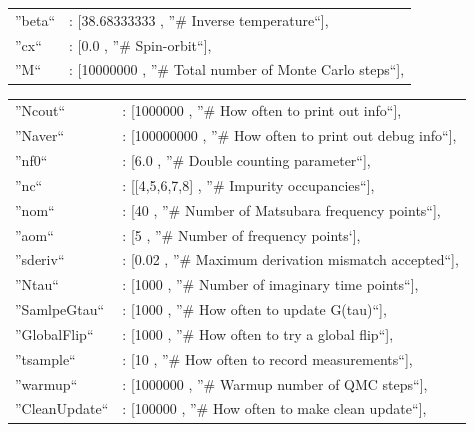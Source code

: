 \documentclass[12 pt]{article}
\begin{document}
\begin{itemize}
{\begin{tabular}{ll}
	    ''beta``	& : [38.68333333		, ''\# Inverse temperature``],\\

	    ''cx``	& : [0.0			, ''\# Spin-orbit``],\\

	    ''M``	& : [10000000		, ''\# Total number of Monte Carlo steps``],\\

  \end{tabular}

  \begin{tabular}{ll}

	    ''Ncout``	& : [1000000		, ''\# How often to print out info``],\\

	    ''Naver``	& : [100000000		, ''\# How often to print out debug info``],\\

	    ''nf0``	& : [6.0			, ''\# Double counting parameter``],\\

	    ''nc``	& : [[4,5,6,7,8]		, ''\# Impurity occupancies``],\\

	    ''nom``	& : [40			, ''\# Number of Matsubara frequency points``],\\

	    ''aom``	& : [5			, ''\# Number of frequency points`],\\

	    ''sderiv``	& : [0.02			, ''\# Maximum derivation mismatch accepted``],\\

	    ''Ntau``	& : [1000			, ''\# Number of imaginary time points``],\\

	    ''SamlpeGtau``	& : [1000		, ''\# How often to update G(tau)``],\\

	    ''GlobalFlip``	& : [1000		, ''\# How often to try a global flip``],\\

	    ''tsample``	& : [10			, ''\# How often to record measurements``],\\

	    ''warmup``	& : [1000000		, ''\# Warmup number of QMC steps``],\\

	    ''CleanUpdate``	& : [100000		, ''\# How often to make clean update``],\\


\end{tabular}}
\end{itemize}
\end{document}
